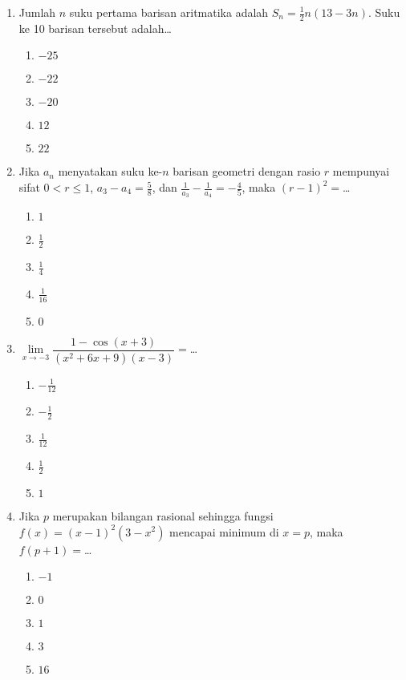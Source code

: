 \documentclass[A4,12PT, english, twocolumn]{journal}
\begin{document}
\begin{enumerate}
\item Jumlah $n$ suku pertama barisan aritmatika adalah $S_n=\frac{1}{2}n(13-3n)$. Suku ke 10 barisan tersebut adalah\dots
    \begin{enumerate}
        \item $-25$
        \item $-22$
        \item $-20$
        \item $12$
        \item $22$
    \end{enumerate}

\item Jika $a_n$ menyatakan suku ke-$n$ barisan geometri dengan rasio $r$ mempunyai sifat $0<r \leq 1$, $a_3-a_4=\frac{5}{8}$, dan $\frac{1}{a_3}-\frac{1}{a_4}=-\frac{4}{5}$, maka $(r-1)^2=$\dots
    \begin{enumerate}
        \item $1$
        \item $\frac{1}{2}$
        \item $\frac{1}{4}$
        \item $\frac{1}{16}$
        \item $0$
    \end{enumerate}

\item $\lim\limits_{x \longrightarrow -3}\dfrac{1-\cos{(x+3)}}{(x^2+6x+9)(x-3)}=$\dots
    \begin{enumerate}
        \item $-\frac{1}{12}$
        \item $-\frac{1}{2}$
        \item $\frac{1}{12}$
        \item $\frac{1}{2}$
        \item $1$
    \end{enumerate}

\item Jika $p$ merupakan bilangan rasional sehingga fungsi $f(x)=(x-1)^2(3-x^2)$ mencapai minimum di $x=p$, maka $f(p+1)=$\dots
    \begin{enumerate}
        \item $-1$
        \item $0$
        \item $1$
        \item $3$
        \item $16$
    \end{enumerate}


\end{enumerate}
\end{document}
